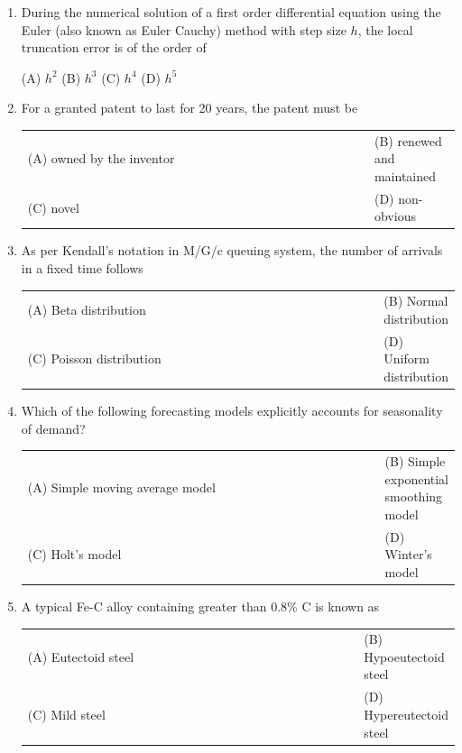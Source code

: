 \documentclass[a4paper,12pt]{article}
\begin{document}
\begin{enumerate}[label=Q.\arabic*, leftmargin=*]
\item During the numerical solution of a first order differential equation using the Euler (also known as Euler Cauchy) method with step size \(h\), the local truncation error is of the order of

(A) $h^2$ \hfill (B) $h^3$ \hfill(C) $h^4$ \hfill (D) $h^5$ \hfill

\item For a granted patent to last for 20 years, the patent must be
\begin{multicols}{2}
\begin{tabular}[t]{p{0.8\linewidth} p{0.9\linewidth}}
(A) owned by the inventor & (B) renewed and maintained \\
(C) novel & (D) non-obvious \\
\end{tabular}
\end{multicols}

\item As per Kendall's notation in M/G/c queuing system, the number of arrivals in a fixed time follows
\begin{multicols}{2}
\begin{tabular}[t]{p{1.4\linewidth} p{1\linewidth}}
(A) Beta distribution & (B) Normal distribution \\
(C) Poisson distribution & (D) Uniform distribution \\
\end{tabular}
\end{multicols}

\item Which of the following forecasting models explicitly accounts for seasonality of demand?
\begin{multicols}{2}
\begin{tabular}[t]{p{0.9\linewidth} p{0.9\linewidth}}
(A) Simple moving average  model & (B) Simple exponential smoothing model \\
(C) Holt's model & (D) Winter's model \\
\end{tabular}
\end{multicols}

\item A typical Fe-C alloy containing greater than 0.8\% C is known as
\begin{multicols}{2}
\begin{tabular}[t]{p{0.8\linewidth} p{0.9\linewidth}}
(A) Eutectoid steel & (B) Hypoeutectoid steel \\
(C) Mild steel & (D) Hypereutectoid steel \\
\end{tabular}
\end{multicols}


\end{enumerate}
\end{document}
